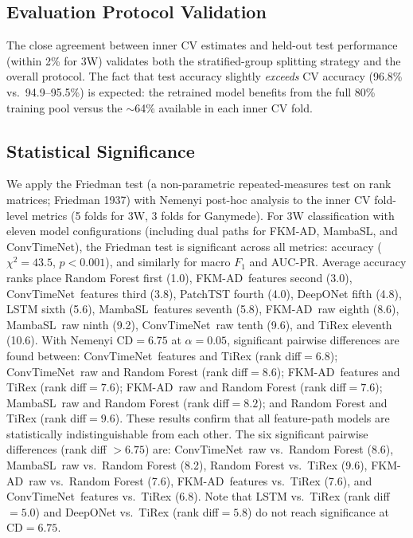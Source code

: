 \documentclass[conference]{IEEEtran}
\begin{document}
\subsection{Evaluation Protocol Validation}

The close agreement between inner CV estimates and held-out test performance (within 2\% for 3W) validates both the stratified-group splitting strategy and the overall protocol. The fact that test accuracy slightly \emph{exceeds} CV accuracy (96.8\% vs.\ 94.9--95.5\%) is expected: the retrained model benefits from the full 80\% training pool versus the $\sim$64\% available in each inner CV fold.

\subsection{Statistical Significance}

We apply the Friedman test (a non-parametric repeated-measures test on rank matrices; Friedman 1937) with Nemenyi post-hoc analysis to the inner CV fold-level metrics (5 folds for 3W, 3 folds for Ganymede). For 3W classification with eleven model configurations (including dual paths for FKM-AD, MambaSL, and ConvTimeNet), the Friedman test is significant across all metrics: accuracy ($\chi^2{=}43.5$, $p < 0.001$), and similarly for macro $F_1$ and AUC-PR. Average accuracy ranks place Random Forest first (1.0), FKM-AD~features second (3.0), ConvTimeNet~features third (3.8), PatchTST fourth (4.0), DeepONet fifth (4.8), LSTM sixth (5.6), MambaSL~features seventh (5.8), FKM-AD~raw eighth (8.6), MambaSL~raw ninth (9.2), ConvTimeNet~raw tenth (9.6), and TiRex eleventh (10.6). With Nemenyi CD${}=6.75$ at $\alpha{=}0.05$, significant pairwise differences are found between: ConvTimeNet~features and TiRex (rank diff$=6.8$); ConvTimeNet~raw and Random Forest (rank diff$=8.6$); FKM-AD~features and TiRex (rank diff$=7.6$); FKM-AD~raw and Random Forest (rank diff$=7.6$); MambaSL~raw and Random Forest (rank diff$=8.2$); and Random Forest and TiRex (rank diff$=9.6$). These results confirm that all feature-path models are statistically indistinguishable from each other. The six significant pairwise differences (rank diff $> 6.75$) are: ConvTimeNet~raw vs.\ Random Forest (8.6), MambaSL~raw vs.\ Random Forest (8.2), Random Forest vs.\ TiRex (9.6), FKM-AD~raw vs.\ Random Forest (7.6), FKM-AD~features vs.\ TiRex (7.6), and ConvTimeNet~features vs.\ TiRex (6.8). Note that LSTM vs.\ TiRex (rank diff$=5.0$) and DeepONet vs.\ TiRex (rank diff$=5.8$) do not reach significance at CD$=6.75$.
\end{document}
